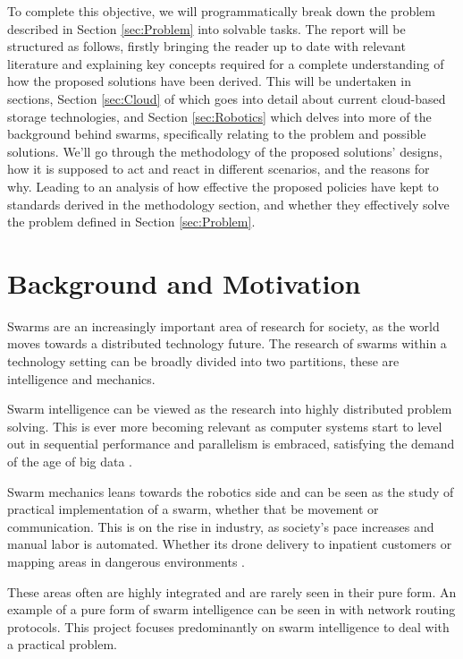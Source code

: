 \documentclass{UoYCSproject}
\begin{document}
To complete this objective, we will programmatically break down the problem described in Section \ref{sec:Problem} into solvable tasks.
The report will be structured as follows, firstly bringing the reader up to date with relevant literature and explaining key concepts required for a complete understanding of how the proposed solutions have been derived.
This will be undertaken in sections, Section \ref{sec:Cloud} of which goes into detail about current cloud-based storage technologies, and Section \ref{sec:Robotics} which delves into more of the background behind swarms, specifically relating to the problem and possible solutions.
We’ll go through the methodology of the proposed solutions’ designs, how it is supposed to act and react in different scenarios, and the reasons for why.
Leading to an analysis of how effective the proposed policies have kept to standards derived in the methodology section, and whether they effectively solve the problem defined in Section \ref{sec:Problem}.


\section{Background and Motivation}
\label{sec:Motivation}

Swarms are an increasingly important area of research for society, as the world moves towards a distributed technology future.
The research of swarms within a technology setting can be broadly divided into two partitions, these are intelligence and mechanics.

Swarm intelligence can be viewed as the research into highly distributed problem solving\cite{Cognitive maps mine detection, Swarm intellegiegence}.
This is ever more becoming relevant as computer systems start to level out in sequential performance \cite{CPU speed} and parallelism is embraced, satisfying the demand of the age of big data \cite{Avalability storage}.

Swarm mechanics leans towards the robotics side and can be seen as the study of practical implementation of a swarm, whether that be movement or communication.
This is on the rise in industry, as society's pace increases and manual labor is automated. Whether its drone delivery to inpatient customers or mapping areas in dangerous environments \cite{Swarm robotics reviewed}.

These areas often are highly integrated and are rarely seen in their pure form.
An example of a pure form of swarm intelligence can be seen in \cite{Swarm intellegiegence} with network routing protocols.
This project focuses predominantly on swarm intelligence to deal with a practical problem.
\end{document}
